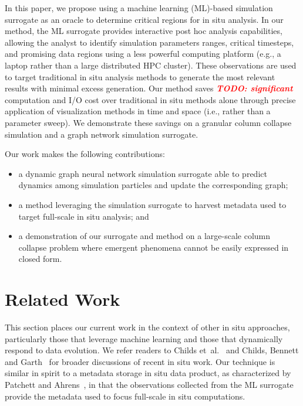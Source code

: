 \documentclass{vgtc}
\newcommand{\fix}[1]{\textcolor{red}{\textbf{\textit{TODO: #1}}}}
\begin{document}
In this paper, we propose using a machine learning (ML)-based simulation surrogate as an oracle to determine critical regions for in situ analysis. In our method, the ML surrogate provides interactive post hoc analysis capabilities, allowing the analyst to identify simulation parameters ranges, critical timesteps, and promising data regions using a less powerful computing platform (e.g., a laptop rather than a large distributed HPC cluster).  These observations are used to target traditional in situ analysis methods to generate the most relevant results with minimal excess generation. Our method saves \fix{significant} computation and I/O cost over traditional in situ methods alone through precise application of visualization methods in time and space (i.e., rather than a parameter sweep). We demonstrate these savings on a granular column collapse simulation and a graph network simulation surrogate.

Our work makes the following contributions: 
\begin{itemize}
    \item a dynamic graph neural network simulation surrogate able to predict dynamics among simulation particles and update the corresponding graph;
    \item a method leveraging the simulation surrogate to harvest metadata used to target full-scale in situ analysis; and
    \item a demonstration of our surrogate and method on a large-scale column collapse problem where emergent phenomena cannot be easily expressed in closed form.
\end{itemize}

\section{Related Work}
\label{sec:related}

This section places our current work in the context of other in situ approaches, particularly those that leverage machine learning and those that dynamically respond to data evolution. We refer readers to Childs et~al.~\cite{childs20insitu} and Childs, Bennett and Garth~\cite{childs22insitu} for broader discussions of recent in situ work. Our technique is similar in spirit to a metadata storage in situ data product, as characterized by Patchett and Ahrens~\cite{patchett18optimizing}, in that the observations collected from the ML surrogate provide the metadata used to focus full-scale in situ computations.
\end{document}
